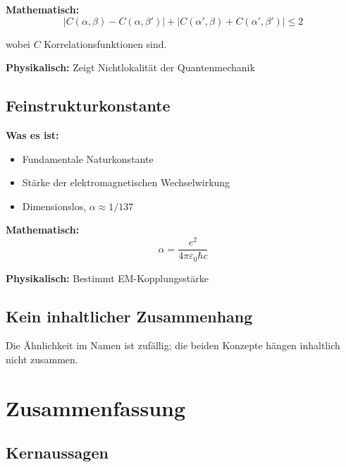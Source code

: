 	\textbf{Mathematisch:}
	\begin{equation}
		|C(\alpha, \beta) - C(\alpha, \beta')| + |C(\alpha', \beta) + C(\alpha', \beta')| \leq 2
	\end{equation}
	
	wobei $C$ Korrelationsfunktionen sind.
	
	\textbf{Physikalisch:} Zeigt Nichtlokalität der Quantenmechanik
	
	\subsection{Feinstrukturkonstante}
	
	\textbf{Was es ist:}
	\begin{itemize}
		\item Fundamentale Naturkonstante
		\item Stärke der elektromagnetischen Wechselwirkung
		\item Dimensionslos, $\alpha \approx 1/137$
	\end{itemize}
	
	\textbf{Mathematisch:}
	\begin{equation}
		\alpha = \frac{e^2}{4\pi\varepsilon_0\hbar c}
	\end{equation}
	
	\textbf{Physikalisch:} Bestimmt EM-Kopplungsstärke
	
	\subsection{Kein inhaltlicher Zusammenhang}
	
	Die Ähnlichkeit im Namen ist zufällig; die beiden Konzepte hängen inhaltlich nicht zusammen.
	
	\section{Zusammenfassung}
	
	\subsection{Kernaussagen}
	
